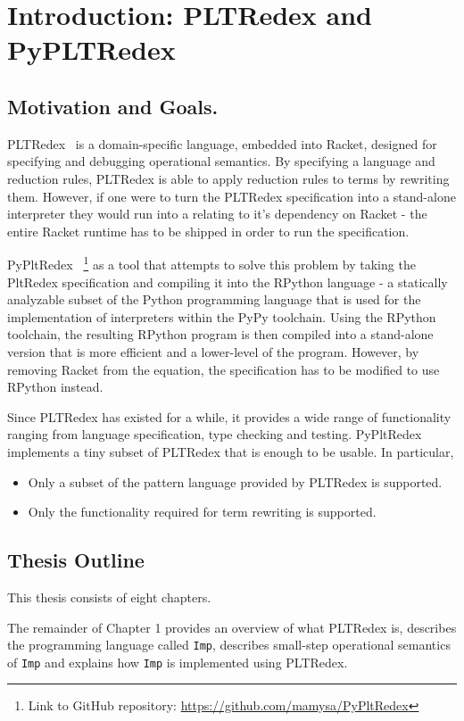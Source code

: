 \chapter{Introduction: PLTRedex and PyPLTRedex}
\section{Motivation and Goals.}
PLTRedex~\cite{pltredex} is a domain-specific language, embedded into Racket, designed for specifying and debugging operational semantics. By specifying a language and reduction rules, PLTRedex is able to apply reduction rules to terms by rewriting them.
However, if one were to turn the PLTRedex specification into a stand-alone interpreter they would run into a relating to it's dependency on Racket - the entire Racket runtime has to be shipped in order to run the specification.

PyPltRedex~\cite{pypltredex-github} \footnote{Link to GitHub repository: \url{https://github.com/mamysa/PyPltRedex}} as a tool that attempts to solve this problem by taking the PltRedex specification and compiling it into the RPython language - a statically analyzable subset of the Python programming language that is used for the implementation of interpreters within the PyPy toolchain. Using the RPython toolchain, the resulting RPython program is then compiled into a stand-alone version that is more efficient and a lower-level of the program. However, by removing Racket from the equation, the specification has to be modified to use RPython instead.

Since PLTRedex has existed for a while, it provides a wide range of functionality ranging from language specification, type checking and testing. PyPltRedex implements a tiny subset of PLTRedex that is enough to be usable. In particular,

\begin{itemize}
\item Only a subset of the pattern language provided by PLTRedex is supported.
\item
Only the functionality required for term rewriting is supported.
\end{itemize}

\section{Thesis Outline}
This thesis consists of eight chapters.

The remainder of Chapter 1 provides an overview of what PLTRedex is, describes the programming language called \texttt{Imp}, describes small-step operational semantics of \texttt{Imp} and explains how \texttt{Imp} is implemented using PLTRedex.

